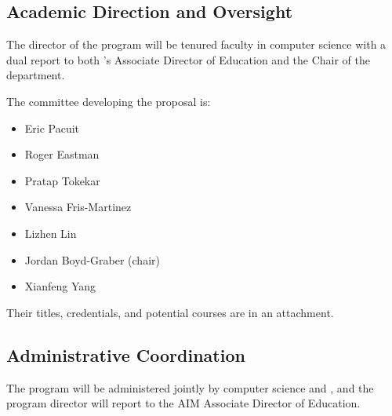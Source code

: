 
\subsection{Academic Direction and Oversight}

The director of the program will be tenured faculty in computer
science with a dual report to both \aim{}'s Associate Director of
Education and the Chair of the  department.

The committee developing the proposal is:
\begin{itemize}
    \item Eric Pacuit
    \item Roger Eastman
    \item Pratap Tokekar
    \item Vanessa Fris-Martinez
    \item Lizhen Lin
    \item Jordan Boyd-Graber (chair)
    \item Xianfeng Yang
\end{itemize}

Their titles, credentials, and potential courses are in an attachment.

\subsection{Administrative Coordination}

The program will be administered jointly by computer science and \aim{}, and the program director will report to the AIM Associate Director of Education.  